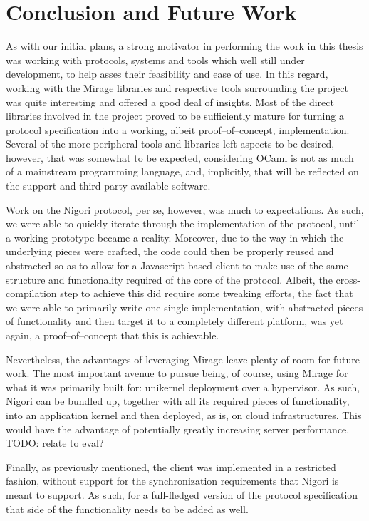 \chapter{Conclusion and Future Work} \label{chapter:conclusion}
As with our initial plans, a strong motivator in performing the work in this thesis was working with protocols, systems and tools which well still under development, to help asses their feasibility and ease of use.
In this regard, working with the Mirage libraries and respective tools surrounding the project was quite interesting and offered a good deal of insights.
Most of the direct libraries involved in the project proved to be sufficiently mature for turning a protocol specification into a working, albeit proof--of--concept, implementation.
Several of the more peripheral tools and libraries left aspects to be desired, however, that was somewhat to be expected, considering OCaml is not as much of a mainstream programming language, and, implicitly, that will be reflected on the support and third party available software.

Work on the Nigori protocol, per se, however, was much to expectations.
As such, we were able to quickly iterate through the implementation of the protocol, until a working prototype became a reality.
Moreover, due to the way in which the underlying pieces were crafted, the code could then be properly reused and abstracted so as to allow for a Javascript based client to make use of the same structure and functionality required of the core of the protocol.
Albeit, the cross-compilation step to achieve this did require some tweaking efforts, the fact that we were able to primarily write one single implementation, with abstracted pieces of functionality and then target it to a completely different platform, was yet again, a proof--of--concept that this is achievable.

Nevertheless, the advantages of leveraging Mirage leave plenty of room for future work.
The most important avenue to pursue being, of course, using Mirage for what it was primarily built for: unikernel deployment over a hypervisor.
As such, Nigori can be bundled up, together with all its required pieces of functionality, into an application kernel and then deployed, as is, on cloud infrastructures.
This would have the advantage of potentially greatly increasing server performance. TODO: relate to eval?

Finally, as previously mentioned, the client was implemented in a restricted fashion, without support for the synchronization requirements that Nigori is meant to support.
As such, for a full-fledged version of the protocol specification that side of the functionality needs to be added as well.
